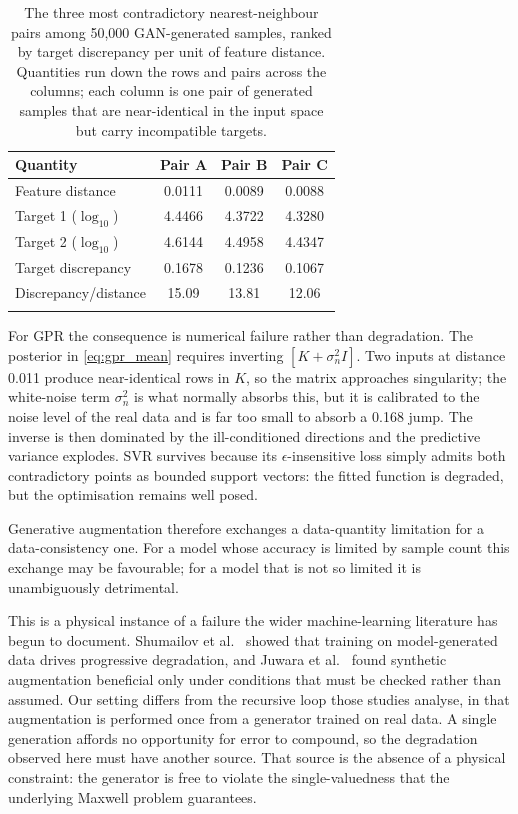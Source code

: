 \documentclass[iicol,pdflatex,sn-basic,Numbered]{sn-jnl}
\begin{document}
\begin{table}[t]
\caption{The three most contradictory nearest-neighbour pairs among 50,000
GAN-generated samples, ranked by target discrepancy per unit of feature
distance. Quantities run down the rows and pairs across the columns; each column
is one pair of generated samples that are near-identical in the input space but
carry incompatible targets.}\label{tab:gan_fail}
\small
\begin{tabular*}{\columnwidth}{@{\extracolsep\fill}lccc}
\toprule
Quantity & Pair A & Pair B & Pair C \\
\midrule
Feature distance         & 0.0111 & 0.0089 & 0.0088 \\
Target 1 ($\log_{10}$)   & 4.4466 & 4.3722 & 4.3280 \\
Target 2 ($\log_{10}$)   & 4.6144 & 4.4958 & 4.4347 \\
Target discrepancy       & 0.1678 & 0.1236 & 0.1067 \\
Discrepancy/distance     & 15.09  & 13.81  & 12.06 \\
\botrule
\end{tabular*}
\end{table}

For GPR the consequence is numerical failure rather than degradation. The
posterior in
\eqref{eq:gpr_mean} requires inverting $[K + \sigma_n^{2}I]$. Two inputs at
distance 0.011 produce near-identical rows in $K$, so the matrix approaches
singularity; the white-noise term $\sigma_n^{2}$ is what normally absorbs this,
but it is calibrated to the noise level of the real data and is far too small to
absorb a 0.168 jump. The inverse is then dominated by the ill-conditioned
directions and the predictive variance explodes. SVR survives because its
$\epsilon$-insensitive loss simply admits both contradictory points as bounded
support vectors: the fitted function is degraded, but the optimisation remains
well posed.

Generative augmentation therefore exchanges a data-quantity limitation for a
data-consistency one. For a model whose accuracy is limited by sample count this
exchange may be favourable; for a model that is not so limited it is
unambiguously detrimental.

This is a physical instance of a failure the wider machine-learning literature has
begun to document. Shumailov et al.~\cite{shumailov2024} showed that training on
model-generated data drives progressive degradation, and Juwara et
al.~\cite{juwara2024} found synthetic augmentation beneficial only under
conditions that must be checked rather than assumed. Our setting differs from the
recursive loop those studies analyse, in that augmentation is performed once from
a generator trained on real data. A single generation affords no opportunity for
error to compound, so the degradation observed here must have another source.
That source is the absence of a physical constraint: the generator is free to
violate the single-valuedness that the underlying Maxwell problem guarantees.
\end{document}
